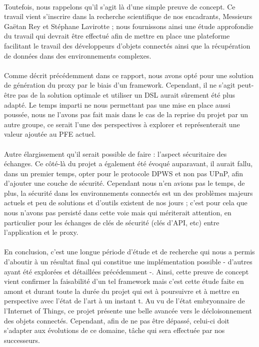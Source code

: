 \documentclass[nocopyrightspace]{sigplanconf}
\begin{document}
	\paragraph{}
	Toutefois, nous rappelons qu’il s’agit là d’une simple preuve de concept. Ce travail vient s’inscrire dans la recherche scientifique de nos encadrants, Messieurs Gaëtan Rey  et Stéphane Lavirotte ; nous fournissons ainsi une étude approfondie du travail qui devrait être effectué afin de mettre en place une plateforme facilitant le travail des développeurs d’objets connectés ainsi que la récupération de données dans des environnements complexes.

	\paragraph{}
	Comme décrit précédemment dans ce rapport, nous avons opté pour une solution de génération du proxy par le biais d’un framework. Cependant, il ne s’agit peut-être pas de la solution optimale et utiliser un DSL aurait sûrement été plus adapté. Le temps imparti ne nous permettant pas une mise en place aussi poussée, nous ne l’avons pas fait mais dans le cas de la reprise du projet par un autre groupe, ce serait l’une des perspectives à explorer et représenterait une valeur ajoutée au PFE actuel.

	\paragraph{}
	Autre élargissement qu’il serait possible de faire : l’aspect sécuritaire des échanges. Ce côté-là du projet a également été évoqué auparavant, il aurait fallu, dans un premier temps, opter pour le protocole DPWS et non pas UPnP, afin d’ajouter une couche de sécurité. Cependant nous n’en avions pas le temps, de plus, la sécurité dans les environnements connectés est un des problèmes majeurs actuels et peu de solutions et d’outils existent de nos jours ; c’est pour cela que nous n’avons pas persisté dans cette voie mais qui mériterait attention, en particulier pour les échanges de clés de sécurité (clés d’API, etc) entre l’application et le proxy.

	\paragraph{}
	En conclusion, c’est une longue période d’étude et de recherche qui nous a permis d’aboutir à un résultat final qui constitue une implémentation possible - d’autres ayant été explorées et détaillées précédemment -. Ainsi, cette preuve de concept vient confirmer la faisabilité d’un tel framework mais c’est cette étude faite en amont et durant toute la durée du projet qui est à poursuivre et à mettre en perspective avec l’état de l’art à un instant t. Au vu de l’état embryonnaire de l’Internet of Things\cite{iot}, ce projet présente une belle avancée vers le décloisonnement des objets connectés. Cependant, afin de ne pas être dépassé, celui-ci doit s’adapter aux évolutions de ce domaine, tâche qui sera effectuée par nos successeurs. 
\end{document}
